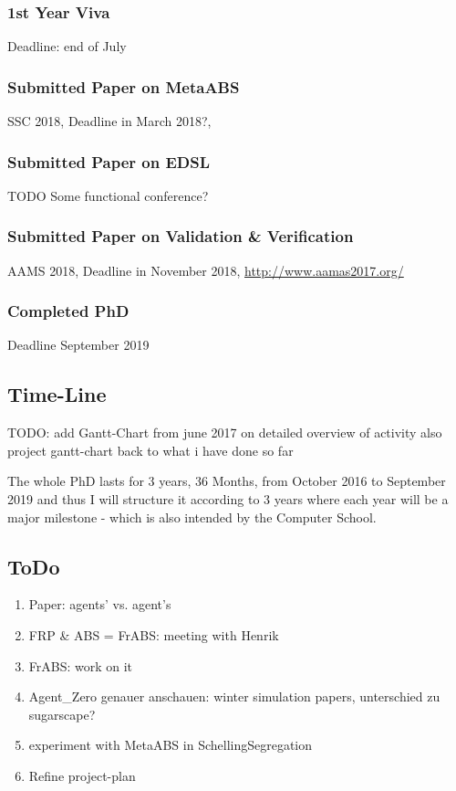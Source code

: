 \subsubsection*{1st Year Viva}
Deadline: end of July

\subsubsection*{Submitted Paper on MetaABS}
SSC 2018, Deadline in March 2018?, 

\subsubsection*{Submitted Paper on EDSL}
TODO Some functional conference?

\subsubsection*{Submitted Paper on Validation \& Verification}
AAMS 2018, Deadline in November 2018, \url{http://www.aamas2017.org/}

\subsubsection*{Completed PhD}
Deadline September 2019


\subsection{Time-Line}
TODO: add Gantt-Chart
from june 2017 on detailed overview of activity
also project gantt-chart back to what i have done so far

The whole PhD lasts for 3 years, 36 Months, from October 2016 to September 2019 and thus I will structure it according to 3 years where each year will be a major milestone - which is also intended by the Computer School.

\subsection{ToDo}
\begin{enumerate}
	\item Paper: agents' vs. agent's
	\item FRP \& ABS = FrABS: meeting with Henrik
	\item FrABS: work on it
	\item Agent\_Zero genauer anschauen: winter simulation papers, unterschied zu sugarscape?
	\item experiment with MetaABS in SchellingSegregation
	\item Refine project-plan 
\end{enumerate}







